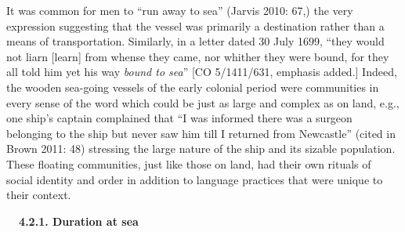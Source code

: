 \begin{styleStandard}
It was common for men to “run away to sea” (Jarvis 2010: 67,) the very expression suggesting that the vessel was primarily a destination rather than a means of transportation. Similarly, in a letter dated 30 July 1699, “they would not liarn [learn] from whense they came, nor whither they were bound, for they all told him yet his way \textit{bound to sea}” [CO 5/1411/631, emphasis added.] Indeed, the wooden sea-going vessels of the early colonial period were communities in every sense of the word which could be just as large and complex as on land, e.g., one ship’s captain complained that “I was informed there was a surgeon belonging to the ship but never saw him till I returned from Newcastle” (cited in Brown 2011: 48) stressing the large nature of the ship and its sizable population. These floating communities, just like those on land, had their own rituals of social identity and order in addition to language practices that were unique to their context.
\end{styleStandard}


\begin{styleStandard}
\textbf{\ \ 4.2.1. Duration at sea}
\end{styleStandard}


